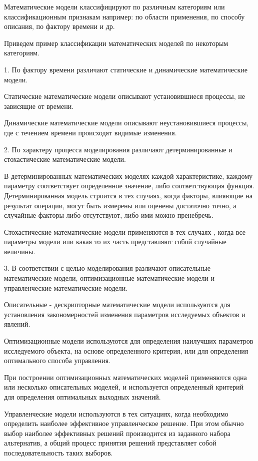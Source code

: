 Математические модели классифицируют по различным категориям или классификационным признакам например: по области применения, по способу описания, по фактору времени и др.


Приведем пример классификации математических моделей по некоторым категориям.


1.	По фактору времени различают статические и динамические математические модели. 


Статические математические модели описывают установившиеся процессы, не зависящие от времени.


Динамические математические модели описывают неустановившиеся процессы, где с течением времени происходят видимые изменения.


2.	По характеру  процесса моделирования различают детерминированные и стохастические математические модели.


В детерминированных математических моделях каждой характеристике, каждому параметру соответствует определенное значение, либо соответствующая функция. Детерминированная модель строится в тех случаях, когда факторы, влияющие на результат операции, могут быть измерены или оценены достаточно точно, а случайные факторы либо отсутствуют, либо ими можно пренебречь.


Стохастические математические модели применяются в тех случаях , когда все параметры модели или какая то их часть представляют собой случайные величины. 


3.	В соответствии с целью моделирования различают описательные математические модели, оптимизационные математические модели и управленческие математические модели.


Описательные - дескрипторные математические модели используются для установления закономерностей изменения параметров исследуемых объектов и явлений. 


Оптимизационные модели используются для определения наилучших параметров исследуемого объекта, на основе определенного критерия, или для определения   оптимального способа управления. 


При построении оптимизационных математических моделей применяются одна или несколько описательных моделей, и используется определенный критерий для определения оптимальных выходных значений. 


Управленческие модели используются в тех ситуациях, когда необходимо определить наиболее эффективное управленческое решение. При этом обычно выбор наиболее эффективных решений производится из заданного набора альтернатив, а общий процесс принятия решений представляет собой последовательность таких выборов.


